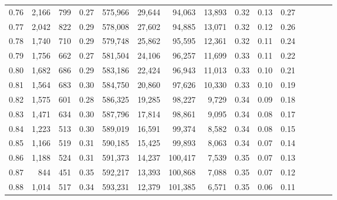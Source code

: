 \begin{tabular}{rrrcrrrrrrrrrrr}
0.76 &   2,166 &    799 &                                       0.27 &  575,966 &   29,644 &   94,063 &   13,893 &  0.32 &  0.13 &                         0.27 \\
0.77 &   2,042 &    822 &                                       0.29 &  578,008 &   27,602 &   94,885 &   13,071 &  0.32 &  0.12 &                         0.26 \\
0.78 &   1,740 &    710 &                                       0.29 &  579,748 &   25,862 &   95,595 &   12,361 &  0.32 &  0.11 &                         0.24 \\
0.79 &   1,756 &    662 &                                       0.27 &  581,504 &   24,106 &   96,257 &   11,699 &  0.33 &  0.11 &                         0.22 \\
0.80 &   1,682 &    686 &                                       0.29 &  583,186 &   22,424 &   96,943 &   11,013 &  0.33 &  0.10 &                         0.21 \\
0.81 &   1,564 &    683 &                                       0.30 &  584,750 &   20,860 &   97,626 &   10,330 &  0.33 &  0.10 &                         0.19 \\
0.82 &   1,575 &    601 &                                       0.28 &  586,325 &   19,285 &   98,227 &    9,729 &  0.34 &  0.09 &                         0.18 \\
0.83 &   1,471 &    634 &                                       0.30 &  587,796 &   17,814 &   98,861 &    9,095 &  0.34 &  0.08 &                         0.17 \\
0.84 &   1,223 &    513 &                                       0.30 &  589,019 &   16,591 &   99,374 &    8,582 &  0.34 &  0.08 &                         0.15 \\
0.85 &   1,166 &    519 &                                       0.31 &  590,185 &   15,425 &   99,893 &    8,063 &  0.34 &  0.07 &                         0.14 \\
0.86 &   1,188 &    524 &                                       0.31 &  591,373 &   14,237 &  100,417 &    7,539 &  0.35 &  0.07 &                         0.13 \\
0.87 &     844 &    451 &                                       0.35 &  592,217 &   13,393 &  100,868 &    7,088 &  0.35 &  0.07 &                         0.12 \\
0.88 &   1,014 &    517 &                                       0.34 &  593,231 &   12,379 &  101,385 &    6,571 &  0.35 &  0.06 &                         0.11 \\

\end{tabular}
